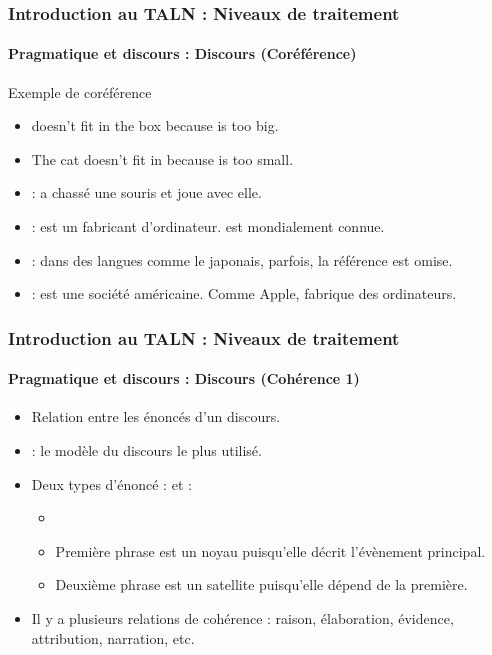 \documentclass[xcolor=table]{beamer}
\begin{document}
\begin{frame}
\frametitle{Introduction au TALN : Niveaux de traitement}
\framesubtitle{Pragmatique et discours : Discours (Coréférence)}

\begin{exampleblock}{Exemple de coréférence}
	\begin{itemize}
		\item {} doesn't fit in the box because  is too big.
		\item The cat doesn't fit in  because  is too small.
	\end{itemize}
\end{exampleblock}

\begin{itemize}
	\item {} :  a chassé une souris et  joue avec elle.
	\item {} :  est un fabricant d'ordinateur.  est mondialement connue.
	\item {} : dans des langues comme le japonais, parfois, la référence est omise.
	\item {} : est une société américaine. Comme Apple,  fabrique des ordinateurs.
\end{itemize}

\end{frame}

\begin{frame}
\frametitle{Introduction au TALN : Niveaux de traitement}
\framesubtitle{Pragmatique et discours : Discours (Cohérence 1)}

\begin{itemize}
	\item Relation entre les énoncés d'un discours.
	\item {} : le modèle du discours le plus utilisé.
	\item Deux types d'énoncé :  et  :
	\begin{itemize}
		\item {}
		\item Première phrase est un noyau puisqu'elle décrit l'évènement principal.
		\item Deuxième phrase est un satellite puisqu'elle dépend de la première.
	\end{itemize}
	\item Il y a plusieurs relations de cohérence : raison, élaboration, évidence, attribution, narration, etc.
\end{itemize}

\end{frame}
\end{document}
